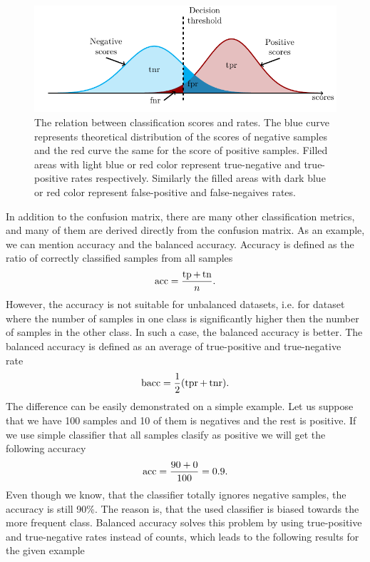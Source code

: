 \begin{figure}
  \centering
  \includegraphics[width=\linewidth]{images/confusion_rates.pdf}
  \caption{The relation between classification scores and  rates. The blue curve represents theoretical distribution of the scores of negative samples and the red curve the same for the score of positive samples. Filled areas with light blue or red color represent true-negative and true-positive rates respectively. Similarly the filled areas with dark blue or red color represent false-positive and false-negaives rates.}
  \label{fig: scores and rates}
\end{figure}
In addition to the confusion matrix, there are many other classification metrics, and many of them are derived directly from the confusion matrix. As an example, we can mention accuracy and the balanced accuracy. Accuracy is defined as the ratio of correctly classified samples from all samples~\cite{metz1978basic}
\begin{equation*}
  \operatorname{acc} = \frac{\operatorname{tp} + \operatorname{tn}}{n}.
\end{equation*}
However, the accuracy is not suitable for unbalanced datasets, i.e. for dataset where the number of samples in one class is significantly higher then the number of samples in the other class. In such a case, the balanced accuracy is better. The balanced accuracy is defined as an average of true-positive and true-negative rate~\cite{brodersen2010balanced}
\begin{equation*}
  \baccuracy = \frac{1}{2}\Brac{\tpr + \tnr}.
\end{equation*}
The difference can be easily demonstrated on a simple example. Let us suppose that we have 100 samples and 10 of them is negatives and the rest is positive. If we use simple classifier that all samples clasify as positive we will get the following accuracy
\begin{equation*}
  \operatorname{acc} = \frac{90 + 0}{100} = 0.9.
\end{equation*}
Even though we know, that the classifier totally ignores negative samples, the accuracy is still 90\%. The reason is, that the used classifier is biased towards the more frequent class. Balanced accuracy solves this problem by using true-positive and true-negative rates instead of counts, which leads to the following results for the given example
